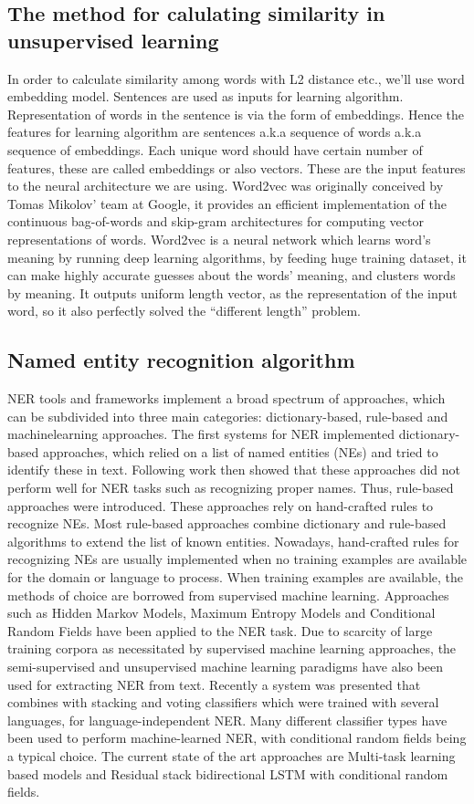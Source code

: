 \documentclass[11pt,a4paper]{article}
\begin{document}
\subsection{The method for calulating similarity in unsupervised learning}
In order to calculate similarity among words with L2 distance etc., we'll use word embedding model. Sentences are used as inputs for learning algorithm. Representation of words in the sentence is via the form of embeddings. Hence the features for learning algorithm are sentences a.k.a sequence of words a.k.a sequence of embeddings. Each unique word should have certain number of features, these are called embeddings or also vectors. These are the input features to the neural architecture we are using. Word2vec was originally conceived by Tomas Mikolov’ team at Google, it provides an efficient implementation of the continuous bag-of-words and skip-gram architectures for computing vector representations of words. Word2vec is a neural network which learns word’s meaning by running deep learning algorithms, by feeding huge training dataset, it can make highly accurate guesses about the words’ meaning, and clusters words by meaning. It outputs uniform length vector, as the representation of the input word, so it also perfectly solved the “different length” problem.


\subsection{Named entity recognition algorithm}
NER tools and frameworks implement a broad spectrum of approaches, which can be subdivided into three main categories: dictionary-based, rule-based and machinelearning approaches. The first systems for NER implemented dictionary-based approaches,
which relied on a list of named entities (NEs) and tried to identify these in text. Following work then showed that these approaches did not perform well for NER tasks such as recognizing proper names. Thus, rule-based approaches were introduced. These approaches rely on hand-crafted rules to recognize NEs. Most rule-based approaches combine dictionary and rule-based algorithms to extend the list of known entities. Nowadays, hand-crafted rules for recognizing NEs are usually implemented when no training examples are available for the domain or language to process. When training examples are available, the methods of choice are borrowed from supervised machine learning. Approaches such as Hidden Markov Models, Maximum Entropy Models and Conditional Random Fields have been applied to the NER task. Due to scarcity of large training corpora as necessitated by supervised machine learning approaches, the semi-supervised and unsupervised machine learning paradigms have also been used for extracting NER from text. Recently a system was presented that combines with stacking and voting classifiers which were trained with several languages, for language-independent NER. Many different classifier types have been used to perform machine-learned NER, with conditional random fields being a typical choice. The current state of the art approaches are Multi-task learning based models and Residual stack bidirectional LSTM with conditional random fields.
\end{document}
